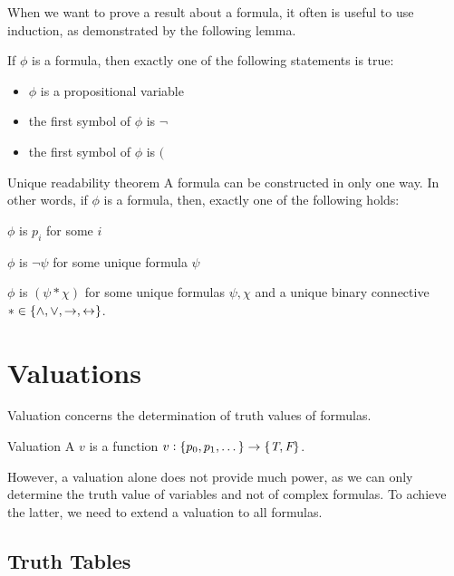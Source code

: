 \documentclass{styles/tufte}
\begin{document}
When we want to prove a result about a formula, it often is useful to use induction, as demonstrated by the following lemma.

\begin{lemma}{}{}
  If $\phi$ is a formula, then exactly one of the following statements is true:
  \begin{itemize}
    \item $\phi$ is a propositional variable
    \item the first symbol of $\phi$ is $\neg$
    \item the first symbol of $\phi$ is $($
  \end{itemize}
\end{lemma}


\begin{theorem}{Unique readability theorem}{}
  A formula can be constructed in only one way. In other words, if $\phi$ is a formula, then, exactly one of the following holds:
  \begin{romanenum}
    \item $\phi$ is $p_i$ for some $i$
    \item $\phi$ is $\neg \psi$ for some unique formula $\psi$
    \item $\phi$ is $(\psi * \chi)$ for some unique formulas $\psi, \chi$ and a unique binary connective $* \in \set{\land, \lor, \rightarrow, \leftrightarrow}$.
  \end{romanenum}
\end{theorem}



\section{Valuations}

Valuation concerns the determination of truth values of formulas.
\begin{definition}{Valuation}{}
  A  $v$ is a function $v: \set{p_0, p_1, \dots} \to \set{\textit{T}, \textit{F}}$.
\end{definition}

However, a valuation alone does not provide much power, as we can only determine the truth value of variables and not of complex formulas. To achieve the latter, we need to extend a valuation to all formulas.


\subsection{Truth Tables}
  
\end{document}
